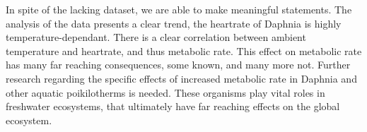 \documentclass[a4paper, british]{article}
\begin{document}
In spite of the lacking dataset, we are able to make meaningful statements. The analysis of the data presents a clear trend, the heartrate of Daphnia is highly temperature-dependant.
There is a clear correlation between ambient temperature and heartrate, and thus metabolic rate. This effect on metabolic rate has many far reaching consequences, some known, and many more not. Further research regarding the specific effects of increased metabolic rate in Daphnia and other aquatic poikilotherms is needed. These organisms play vital roles in freshwater ecosystems, that ultimately have far reaching  effects on the global ecosystem.
\printbibliography
\end{document}
